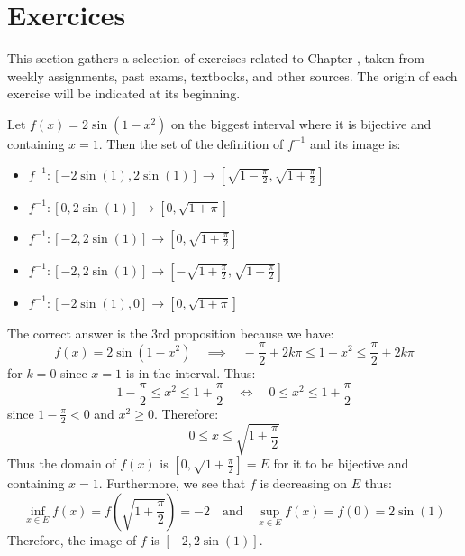 \section{Exercices}
This section gathers a selection of exercises related to Chapter \thechapter, taken from weekly assignments, past exams, textbooks, and other sources. The origin of each exercise will be indicated at its beginning.

\begin{exercise}
    Let $f(x) = 2 \sin(1 - x^2)$ on the biggest interval where it is bijective and containing $x= 1$. Then the set of the definition of $f^{-1}$ and its image is:
    \begin{itemize}[itemsep=1pt,label=$\circ$]
        \item $f^{-1}: \left[-2 \sin(1), 2 \sin(1)\right] \to \left[\sqrt{1 - \frac{\pi}{2}}, \sqrt{1 + \frac{\pi}{2}}\right]$
        \item $f^{-1}: \left[0, 2 \sin(1)\right] \to \left[0, \sqrt{1 + \pi}\right]$
        \item $f^{-1}: \left[-2, 2 \sin(1)\right] \to \left[0, \sqrt{1 + \frac{\pi}{2}}\right]$
        \item $f^{-1}: \left[-2, 2 \sin(1)\right] \to \left[-\sqrt{1 + \frac{\pi}{2}}, \sqrt{1 + \frac{\pi}{2}}\right]$
        \item $f^{-1}: \left[-2 \sin(1), 0\right] \to \left[0, \sqrt{1 + \pi}\right]$
    \end{itemize}
    \Answer
    The correct answer is the 3rd proposition because we have:
    \[
        f(x) = 2 \sin(1 - x^2) \quad \implies \quad - \frac{\pi}{2} + 2k\pi \leq 1 - x^2 \leq \frac{\pi}{2} + 2k\pi
    \]
    for $k = 0$ since $x = 1$ is in the interval. Thus:
    \[
        1 - \frac{\pi}{2} \leq x^2 \leq 1 + \frac{\pi}{2} \quad \iff \quad 0 \leq x^2 \leq 1 + \frac{\pi}{2}
    \]
    since $1 - \frac{\pi}{2} < 0$ and $x^2 \geq 0$. Therefore:
    \[
        0 \leq x \leq \sqrt{1 + \frac{\pi}{2}}
    \]
    Thus the domain of $f(x)$ is $\left[0, \sqrt{1 + \frac{\pi}{2}}\right] = E$ for it to be bijective and containing $x = 1$. Furthermore, we see that $f$ is decreasing on $E$ thus:
    \[
        \inf_{x \in E} f(x) = f\left(\sqrt{1 + \frac{\pi}{2}}\right) = -2 \quad \text{and} \quad \sup_{x \in E} f(x) = f(0) = 2 \sin(1)
    \]
    Therefore, the image of $f$ is $\left[-2, 2 \sin(1)\right]$.
\end{exercise}